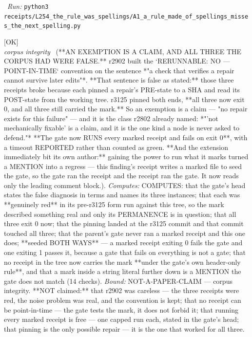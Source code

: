 \begin{description}
\ \emph{Run:} \texttt{python3 receipts/L254\_the\_rule\_was\_spellings/A1\_a\_rule\_made\_of\_spellings\_misses\_the\_next\_spelling.py}
\item[\label{rcpt:E1_an_exemption_is_a_claim_and_all_three_were_false}\texttt{E1\_an\_exemption\_is\_a\_claim\_and\_all\_three\_were\_false}]\hfill\textsf{[OK]}\\
\textit{corpus integrity} \ (**AN EXEMPTION IS A CLAIM, AND ALL THREE THE CORPUS HAD WERE FALSE.** r2902 built the `RERUNNABLE: NO --- POINT-IN-TIME` convention on the sentence *"a check that verifies a repair cannot survive later edits"*. **That sentence is false as stated:** those three receipts broke because each pinned a repair's PRE-state to a SHA and read its POST-state from the working tree. r3125 pinned both ends, **all three now exit 0, and all three still carried the mark.** So an exemption is a claim --- "no repair exists for this failure" --- and it is the class r2802 already named: *"'not mechanically fixable' is a claim, and it is the one kind a node is never asked to defend."* **The gate now RUNS every marked receipt and fails on exit 0**, with a timeout REPORTED rather than counted as green. **And the extension immediately bit its own author:** gaining the power to run what it marks turned a MENTION into a regress --- this finding's receipt writes a marked file to seed the gate, so the gate ran the receipt and the receipt ran the gate. It now reads only the leading comment block.). 
\emph{Computes:} COMPUTES: that the gate's head states the false diagnosis in terms and names its three instances; that each was **genuinely red** in its pre-r3125 form run against this tree, so the mark described something real and only its PERMANENCE is in question; that all three exit 0 now; that the pinning landed at the r3125 commit and that commit touched all three; that the parent's gate never ran a marked receipt and this one does; **seeded BOTH WAYS** --- a marked receipt exiting 0 fails the gate and one exiting 1 passes it, because a gate that fails on everything is not a gate; that no receipt in the tree now carries the mark **under the gate's own header-only rule**, and that a mark inside a string literal further down is a MENTION the gate does not match (14 checks).
 \emph{Bound:} NOT-A-PAPER-CLAIM --- corpus integrity. **NOT claimed:** that r2902 was careless --- the three receipts were red, the noise problem was real, and the convention is kept; that no receipt can be point-in-time --- the gate tests the mark, it does not forbid it; that running every marked receipt is free --- one capped run each, stated in the gate's head; that pinning is the only possible repair --- it is the one that worked for all three.

\end{description}
